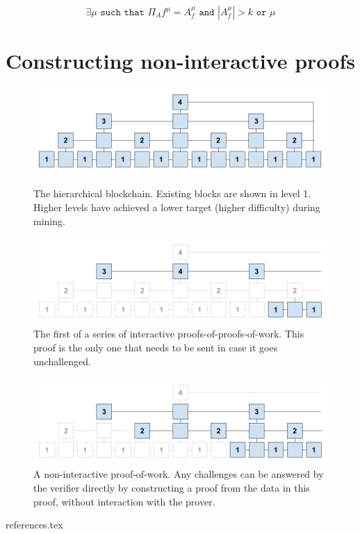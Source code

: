 \documentclass[11pt]{llncs}
\begin{document}
\begin{equation*}
    \exists \mu \texttt{ such that } \Pi_{A}{f}^{\mu} = A_f^{\mu}
    \texttt{ and }
    |A_f^{\mu}| > k
    \texttt{ or } \mu
\end{equation*}

\section{Constructing non-interactive proofs}

\begin{figure}[h]
    \caption{The hierarchical blockchain. Existing blocks are shown in level 1.
    Higher levels have achieved a lower target (higher difficulty) during mining.}
    \centering
    \includegraphics[width=\textwidth,keepaspectratio]{figures/hierarchical-ledger.png}
    \label{fig:hierarchy}
\end{figure}

\begin{figure}[h]
    \caption{The first of a series of interactive proofs-of-proofs-of-work.
    This proof is the only one that needs to be sent in case it goes
    unchallenged.}
    \centering
    \includegraphics[width=\textwidth,keepaspectratio]{figures/interactive-popow.png}
\end{figure}

\begin{figure}[h]
    \caption{A non-interactive proof-of-work. Any challenges can be answered by
    the verifier directly by constructing a proof from the data in this proof,
    without interaction with the prover.}
    \centering
    \includegraphics[width=\textwidth,keepaspectratio]{figures/non-interactive-popow.png}
\end{figure}

{references.tex}
\end{document}
